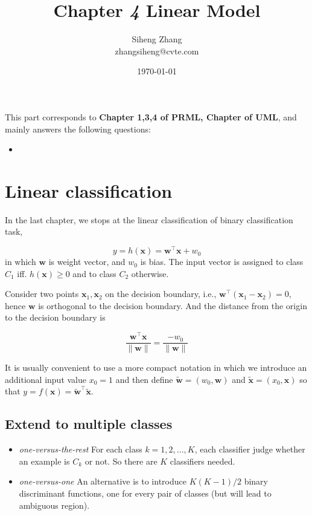 \documentclass{article}
\author{Siheng Zhang\\zhangsiheng@cvte.com}
\title{Chapter \textbf{\textit{4}} Linear Model}
\date{\today}
\begin{document}
\maketitle  

This part corresponds to \textbf{Chapter 1,3,4 of PRML, Chapter of UML}, and mainly answers the following questions:

\begin{itemize}
\item 
\end{itemize}

\tableofcontents
\newpage

\section{Linear classification}

	In the last chapter, we stops at the linear classification of binary classification task,
	
	\begin{equation}
	y=h(\mathbf{x})=\mathbf{w}^\top \mathbf{x} + w_0
	\end{equation}
in which $\mathbf{w}$ is weight vector, and $w_0$ is bias. The input vector is assigned to class $C_1$ iff. $h(\mathbf{x})\geq 0$ and to class $C_2$ otherwise.

	Consider two points $\mathbf{x}_1,\mathbf{x}_2$ on the decision boundary, i.e., $\mathbf{w}^\top (\mathbf{x}_1 - \mathbf{x}_2) = 0$, hence $\mathbf{w}$ is orthogonal to the decision boundary. And the distance from the origin to the decision boundary is
	
	\begin{equation}
	\frac{\mathbf{w}^\top \mathbf{x}}{\|\mathbf{w}\|} = \frac{-w_0}{\|\mathbf{w}\|}
	\end{equation}
	
	It is usually convenient to use a more compact notation in which we introduce an additional input value $x_0 = 1$ and then define $\tilde{\mathbf{w}} = (w_0, \mathbf{w})$ and $\tilde{\mathbf{x}} = (x_0, \mathbf{x})$ so that $y=f(\mathbf{x}) = \tilde{\mathbf{w}}^\top \tilde{\mathbf{x}}$.
	
	\subsection{Extend to multiple classes}
	
	\begin{itemize}
	\item \textit{one-versus-the-rest} For each class $k=1,2,...,K$, each classifier judge whether an example is $C_k$ or not. So there are $K$ classifiers needed.
	\item \textit{one-versus-one} An alternative is to introduce $K(K-1)/2$ binary discriminant functions, one for every pair of classes (but will lead to ambiguous region).
	\end{itemize}
	
\end{document}
